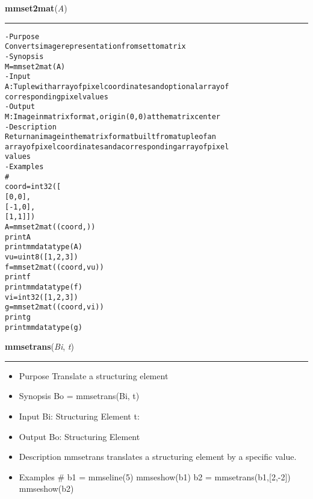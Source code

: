     \begin{boxedminipage}{\textwidth}

    \raggedright \textbf{mmset2mat}(\textit{A})

    \vspace{-1.5ex}

    \rule{\textwidth}{0.5\fboxrule}
\begin{alltt}
- Purpose
    Converts image representation from set to matrix
- Synopsis
    M = mmset2mat(A)
- Input
    A: Tuple with array of pixel coordinates and optional array of
       corresponding pixel values
- Output
    M: Image in matrix format, origin (0,0) at the matrix center
- Description
    Return an image in the matrix format built from a tuple of an
    array of pixel coordinates and a corresponding array of pixel
    values
- Examples
    \#
    coord=int32([
      [ 0,0],
      [-1,0],
      [ 1,1]])
    A=mmset2mat((coord,))
    print A
    print mmdatatype(A)
    vu = uint8([1,2,3])
    f=mmset2mat((coord,vu))
    print f
    print mmdatatype(f)
    vi = int32([1,2,3])
    g=mmset2mat((coord,vi))
    print g
    print mmdatatype(g)\end{alltt}

    \vspace{1ex}

    \end{boxedminipage}

    \label{multireg:num_pymorph:mmsetrans}
    \vspace{0.5ex}

    \begin{boxedminipage}{\textwidth}

    \raggedright \textbf{mmsetrans}(\textit{Bi}, \textit{t})

    \vspace{-1.5ex}

    \rule{\textwidth}{0.5\fboxrule}
    \begin{itemize}
    \setlength{\parskip}{0.6ex}
      \item Purpose Translate a structuring element

      \item Synopsis Bo = mmsetrans(Bi, t)

      \item Input Bi: Structuring Element t:

      \item Output Bo: Structuring Element

      \item Description mmsetrans translates a structuring element by a 
        specific value.

      \item Examples \# b1 = mmseline(5) mmseshow(b1) b2 = 
        mmsetrans(b1,[2,-2]) mmseshow(b2)

    \end{itemize}

    \vspace{1ex}

    \end{boxedminipage}


